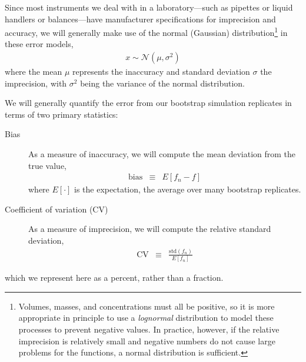 \documentclass[aps,pre,twocolumn,nofootinbib,superscriptaddress,linenumbers]{revtex4-1}
\begin{document}
Since most instruments we deal with in a laboratory---such as pipettes or liquid handlers or balances---have manufacturer specifications for imprecision and accuracy, we will generally make use of the normal (Gaussian) distribution\footnote{Volumes, masses, and concentrations must all be positive, so it is more appropriate in principle to use a \emph{lognormal} distribution to model these processes to prevent negative values.  In practice, however, if the relative imprecision is relatively small and negative numbers do not cause large problems for the functions, a normal distribution is sufficient.} in these error models,
\begin{eqnarray}
x \sim \mathcal{N}(\mu, \sigma^2) \label{equation:Gaussian}
\end{eqnarray}
where the mean $\mu$ represents the inaccuracy and standard deviation $\sigma$ the imprecision, with $\sigma^2$ being the variance of the normal distribution.

We will generally quantify the error from our bootstrap simulation replicates in terms of two primary statistics:
\begin{description}
\item[Bias] As a measure of inaccuracy, we will compute the mean deviation from the true value,
\begin{eqnarray}
\mathrm{bias} &\equiv& E[ f_n - f ]
\end{eqnarray}
where $E[\cdot]$ is the expectation, the average over many bootstrap replicates.
\item[Coefficient of variation (CV)] As a measure of imprecision, we will compute the relative standard deviation,
\begin{eqnarray}
\mathrm{CV} &\equiv& \frac{\mathrm{std}(f_n)}{E[f_n]}
\end{eqnarray}
\end{description}
which we represent here as a percent, rather than a fraction.

\end{document}
